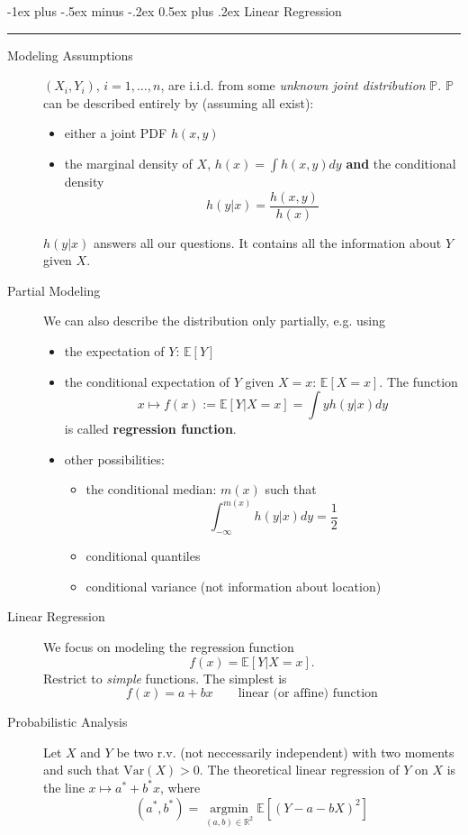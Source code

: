 \documentclass[a4paper, 10pt,landscape]{article}
\makeatletter
\DeclareMathOperator*{\argmin}{argmin}
\newcommand{\var}{\textrm{Var}}
\renewcommand{\section}{\@startsection{section}{1}{0mm}%
                                {-1ex plus -.5ex minus -.2ex}%
                                {0.5ex plus .2ex}%
                                {\normalfont\large\bfseries}}
\makeatother
\begin{document}
\begin{multicols*}{3}
\section{Linear Regression}\smallskip \hrule height 1pt \smallskip

\begin{description}
	\item [Modeling Assumptions] $\left(X_i,Y_i\right)$, $i=1,\dots,n$, are i.i.d. from some {\it unknown joint distribution} $\mathbb{P}$. $\mathbb{P}$ can be described entirely by (assuming all exist):
	\begin{itemize}
		\item either a joint PDF $h(x,y)$
		\item the marginal density of $X$, $h(x)=\int h(x,y)dy$ {\bf and} the conditional density $$h(y|x)=\dfrac{h(x,y)}{h(x)}$$
	\end{itemize}
	$h(y|x)$ answers all our questions. It contains all the information about $Y$ given $X$.
	\item [Partial Modeling] We can also describe the distribution only partially, e.g. using
	\begin{itemize}
		\item the expectation of $Y$: $\mathbb{E}\left[Y\right]$
		\item the conditional expectation of $Y$ given $X=x$: $\mathbb{E}\left[X=x\right]$. The function $$x\mapsto f(x):=\mathbb{E}\left[Y|X=x\right]=\int yh(y|x)dy$$ is called {\bf regression function}.
		\item other possibilities:
		\begin{itemize}[noitemsep]
			\item the conditional median: $m(x)$ such that $$\int_{-\infty}^{m(x)}h(y|x)dy=\frac{1}{2}$$
			\item conditional quantiles
			\item conditional variance (not information about location)
		\end{itemize}
	\end{itemize}
	\item[Linear Regression] We focus on modeling the regression function
	$$f(x)=\mathbb{E}\left[Y\rvert X=x\right].$$
	Restrict to {\it simple} functions. The simplest is
	$$f(x)=a+bx\qquad\text{linear (or affine) function}$$
	\item[Probabilistic Analysis] Let $X$ and $Y$ be two r.v. (not neccessarily independent) with two moments and such that $\var\left(X\right)>0.$ The theoretical linear regression of $Y$ on $X$ is the line $x\mapsto a^*+b^*x$, where $$\left(a^*,b^*\right)=\argmin\limits_{(a,b)\in\mathbb{R}^2}\mathbb{E}\left[\left(Y-a-bX\right)^2\right]$$

\end{description}
\end{multicols*}
\end{document}
